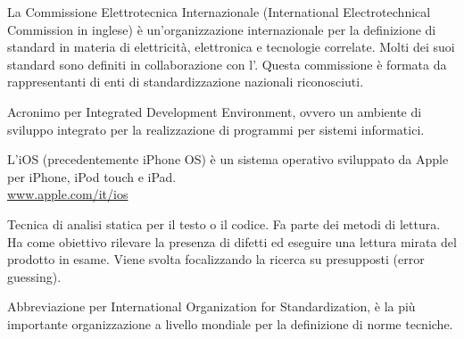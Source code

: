 La Commissione Elettrotecnica Internazionale (International Electrotechnical Commission in inglese) è un'organizzazione internazionale per la definizione di standard in materia di elettricità, elettronica e tecnologie correlate. Molti dei suoi standard sono definiti in collaborazione con l'. Questa commissione è formata da rappresentanti di enti di standardizzazione nazionali riconosciuti.\\


Acronimo per Integrated Development Environment, ovvero un ambiente di sviluppo integrato per la realizzazione di programmi per sistemi informatici.

L'iOS (precedentemente iPhone OS) è un sistema operativo sviluppato da Apple per iPhone, iPod touch e iPad.\\
\url{www.apple.com/it/ios}

Tecnica di analisi statica per il testo o il codice. Fa parte dei metodi di lettura. Ha come obiettivo rilevare la presenza di difetti ed eseguire una lettura mirata del prodotto in esame. Viene svolta focalizzando la ricerca su presupposti (error guessing).

Abbreviazione per International Organization for Standardization, è la più importante organizzazione a livello mondiale per la definizione di norme tecniche.
\clearpage